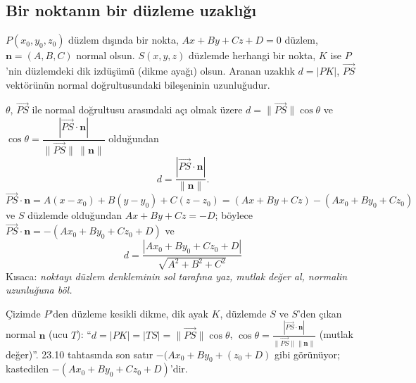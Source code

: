 \subsection{Bir noktanın bir düzleme uzaklığı}

$P(x_0,y_0,z_0)$ düzlem dışında bir nokta, $Ax+By+Cz+D=0$ düzlem, $\mathbf n=(A,B,C)$ normal olsun. $S(x,y,z)$ düzlemde herhangi bir nokta, $K$ ise $P$'nin düzlemdeki dik izdüşümü (dikme ayağı) olsun. Aranan uzaklık $d=|PK|$, $\overrightarrow{PS}$ vektörünün normal doğrultusundaki bileşeninin uzunluğudur.

\begin{center}
\end{center}

\begin{teorem}
$\theta$, $\overrightarrow{PS}$ ile normal doğrultusu arasındaki açı olmak üzere $d=\|\overrightarrow{PS}\|\cos\theta$ ve $\cos\theta=\dfrac{|\overrightarrow{PS}\cdot\mathbf n|}{\|\overrightarrow{PS}\|\,\|\mathbf n\|}$ olduğundan
\[ d=\frac{|\overrightarrow{PS}\cdot\mathbf n|}{\|\mathbf n\|}. \]
$\overrightarrow{PS}\cdot\mathbf n=A(x-x_0)+B(y-y_0)+C(z-z_0)=(Ax+By+Cz)-(Ax_0+By_0+Cz_0)$ ve $S$ düzlemde olduğundan $Ax+By+Cz=-D$; böylece $\overrightarrow{PS}\cdot\mathbf n=-(Ax_0+By_0+Cz_0+D)$ ve
\[ \boxed{\ d=\frac{|Ax_0+By_0+Cz_0+D|}{\sqrt{A^2+B^2+C^2}}\ } \]
Kısaca: \emph{noktayı düzlem denkleminin sol tarafına yaz, mutlak değer al, normalin uzunluğuna böl.}
\end{teorem}

\begin{tahta}
Çizimde $P$'den düzleme kesikli dikme, dik ayak $K$, düzlemde $S$ ve $S$'den çıkan normal $\mathbf n$ (ucu $T$): ``$d=|PK|=|TS|=\|\overrightarrow{PS}\|\cos\theta$, $\cos\theta=\frac{|\overrightarrow{PS}\cdot\mathbf n|}{\|\overrightarrow{PS}\|\|\mathbf n\|}$ (mutlak değer)''. 23.10 tahtasında son satır $-(Ax_0+By_0+(z_0+D)$ gibi görünüyor; kastedilen $-(Ax_0+By_0+Cz_0+D)$'dir.
\end{tahta}


